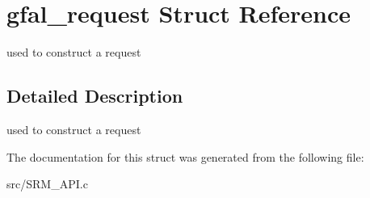 \section{gfal\_\-request Struct Reference}
\label{structgfal__request}
used to construct a request  




\subsection{Detailed Description}
used to construct a request 



The documentation for this struct was generated from the following file:\begin{CompactItemize}
\item 
src/SRM\_\-API.c\end{CompactItemize}
